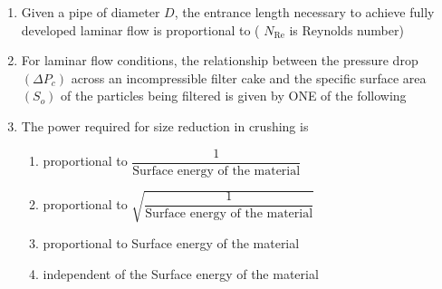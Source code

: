 \documentclass[journal,12pt,onecolumn]{IEEEtran}
\theoremstyle{remark}
\begin{document}
\begin{enumerate}
    \item Given a pipe of diameter $D$, the entrance length necessary to achieve fully developed laminar flow is proportional to ( $N_{\text{Re}}$ is Reynolds number)
    \hfill{}
    \begin{enumerate}[label=(\Alph*)]
    \end{enumerate}

    \item For laminar flow conditions, the relationship between the pressure drop $(\Delta P_c)$ across an incompressible filter cake and the specific surface area $(S_o)$ of the particles being filtered is given by ONE of the following
    \hfill{}
    \begin{enumerate}[label=(\Alph*)]
        \end{enumerate}
        
    \item The power required for size reduction in crushing is
    \hfill{}
    \begin{enumerate}[label=(\Alph*)]
        \item proportional to $\dfrac{1}{\text{Surface energy of the material}}$
        \item proportional to $\sqrt{\dfrac{1}{\text{Surface energy of the material}}}$
        \item proportional to Surface energy of the material
        \item independent of the Surface energy of the material
    \end{enumerate}


\end{enumerate}
\end{document}
